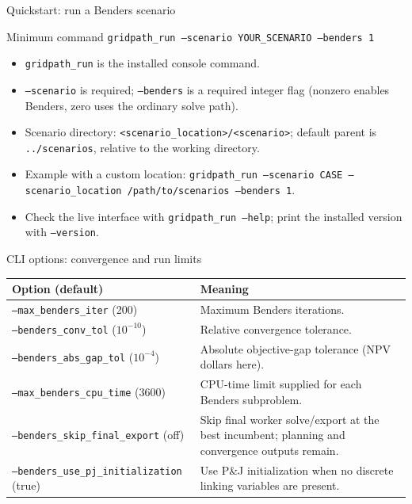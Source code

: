 \documentclass[aspectratio=169,10pt]{beamer}
\begin{document}
\begin{frame}{Quickstart: run a Benders scenario}
\small
\begin{block}{Minimum command}
\texttt{gridpath\_run --scenario YOUR\_SCENARIO --benders 1}
\end{block}
\begin{itemize}
\item \texttt{gridpath\_run} is the installed console command.
\item \texttt{--scenario} is required; \texttt{--benders} is a required integer flag (nonzero enables Benders, zero uses the ordinary solve path).
\item Scenario directory: \texttt{<scenario\_location>/<scenario>}; default parent is \texttt{../scenarios}, relative to the working directory.
\item Example with a custom location: \texttt{gridpath\_run --scenario CASE --scenario\_location /path/to/scenarios --benders 1}.
\item Check the live interface with \texttt{gridpath\_run --help}; print the installed version with \texttt{--version}.
\end{itemize}
\end{frame}

\begin{frame}{CLI options: convergence and run limits}
\scriptsize
\begin{tabular}{@{}p{}p{}@{}}
\toprule Option (default) & Meaning \\
\midrule
\texttt{--max\_benders\_iter} (200) & Maximum Benders iterations.\\
\texttt{--benders\_conv\_tol} ($10^{-10}$) & Relative convergence tolerance.\\
\texttt{--benders\_abs\_gap\_tol} ($10^{-4}$) & Absolute objective-gap tolerance (NPV dollars here).\\
\texttt{--max\_benders\_cpu\_time} (3600) & CPU-time limit supplied for each Benders subproblem.\\
\texttt{--benders\_skip\_final\_export} (off) & Skip final worker solve/export at the best incumbent; planning and convergence outputs remain.\\
\texttt{--benders\_use\_pj\_initialization} (true) & Use P\&J initialization when no discrete linking variables are present.\\
\bottomrule
\end{tabular}
\end{frame}
\end{document}

